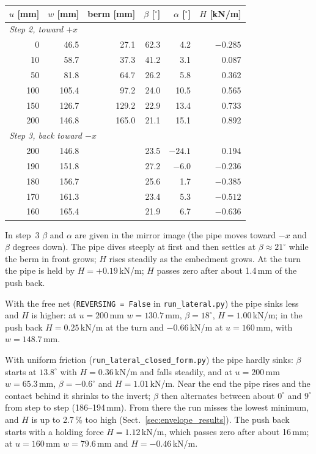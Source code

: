 \documentclass[11pt,a4paper]{article}
\begin{document}
\begin{center}
\begin{tabular}{rrrrrr}
\toprule
$u$ [mm] & $w$ [mm] & berm [mm] & $\beta$ [$^\circ$] & $\alpha$ [$^\circ$] & $H$ [kN/m] \\
\midrule
\multicolumn{6}{l}{\emph{Step 2, toward $+x$}} \\
0   & 46.5  & 27.1  & 62.3 & 4.2  & $-0.285$ \\
10  & 58.7  & 37.3  & 41.2 & 3.1  & 0.087 \\
50  & 81.8  & 64.7  & 26.2 & 5.8  & 0.362 \\
100 & 105.4 & 97.2  & 24.0 & 10.5 & 0.565 \\
150 & 126.7 & 129.2 & 22.9 & 13.4 & 0.733 \\
200 & 146.8 & 165.0 & 21.1 & 15.1 & 0.892 \\
\midrule
\multicolumn{6}{l}{\emph{Step 3, back toward $-x$}} \\
200 & 146.8 & & 23.5 & $-24.1$ & 0.194 \\
190 & 151.8 & & 27.2 & $-6.0$  & $-0.236$ \\
180 & 156.7 & & 25.6 & 1.7     & $-0.385$ \\
170 & 161.3 & & 23.4 & 5.3     & $-0.512$ \\
160 & 165.4 & & 21.9 & 6.7     & $-0.636$ \\
\bottomrule
\end{tabular}
\end{center}

In step~3 $\beta$ and $\alpha$ are given in the mirror image (the pipe
moves toward $-x$ and $\beta$ degrees down).  The pipe dives steeply
at first and then settles at $\beta \approx 21^\circ$ while the berm in
front grows; $H$ rises steadily as the embedment grows.
At the turn the pipe is held by $H = +0.19$\,kN/m; $H$ passes zero
after about 1.4\,mm of the push back.

With the free net (\texttt{REVERSING = False} in
\texttt{run\_lateral.py}) the pipe sinks less and $H$ is higher: at
$u = 200$\,mm $w = 130.7$\,mm, $\beta = 18^\circ$, $H = 1.00$\,kN/m;
in the push back $H = 0.25$\,kN/m at the turn and $-0.66$\,kN/m at
$u = 160$\,mm, with $w = 148.7$\,mm.

With uniform friction (\texttt{run\_lateral\_closed\_form.py}) the pipe
hardly sinks: $\beta$ starts at $13.8^\circ$ with $H = 0.36$\,kN/m and
falls steadily, and at $u = 200$\,mm $w = 65.3$\,mm,
$\beta = -0.6^\circ$ and $H = 1.01$\,kN/m.  Near the end the pipe rises
and the contact behind it shrinks to the invert; $\beta$ then alternates
between about $0^\circ$ and $9^\circ$ from step to step (186--194\,mm).
From there the run misses the lowest minimum, and $H$ is up to
2.7\,\% too high (Sect.~\ref{sec:envelope_results}).  The push back
starts with a holding force $H = 1.12$\,kN/m, which passes zero after
about 16\,mm; at $u = 160$\,mm $w = 79.6$\,mm and $H = -0.46$\,kN/m.
\end{document}
